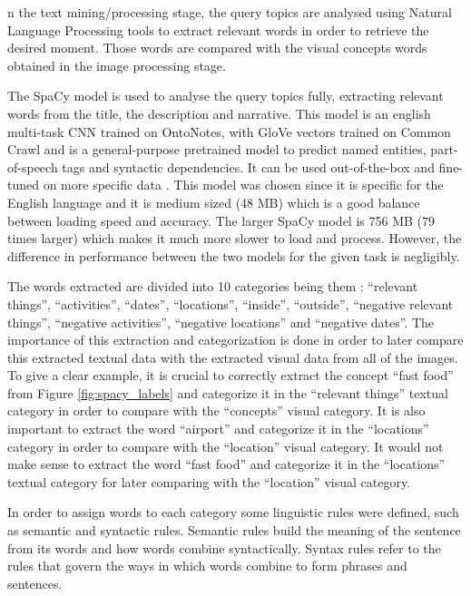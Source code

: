 n the text mining/processing stage, the query topics are analysed using Natural Language Processing tools to extract relevant words in order to retrieve the desired moment. Those words are compared with the visual concepts words obtained in the image processing stage. 

The SpaCy model \cite{Spacy2017} is used to analyse the query topics fully, extracting relevant words from the title, the description and narrative. This model is an english multi-task CNN trained on OntoNotes, with GloVe vectors trained on Common Crawl and is a general-purpose pretrained model to predict named entities, part-of-speech tags and syntactic dependencies. It can be used out-of-the-box and fine-tuned on more specific data \cite{Spacy2017}. This model was chosen since it is specific for the English language and it is medium sized (48 MB) which is a good balance between loading speed and accuracy. The larger SpaCy model is 756 MB (79 times larger) which makes it much more slower to load and process. However, the difference in performance between the two models for the given task is negligibly.




The words extracted are divided into 10 categories being them : \enquote{relevant things}, \enquote{activities}, \enquote{dates}, \enquote{locations}, \enquote{inside}, \enquote{outside}, \enquote{negative relevant things}, \enquote{negative activities}, \enquote{negative locations} and \enquote{negative dates}. The importance of this extraction and categorization is done in order to later compare this extracted textual data with the extracted visual data from all of the images. To give a clear example, it is crucial to correctly extract the concept \enquote{fast food} from Figure \ref{fig:spacy_labels} and categorize it in the \enquote{relevant things} textual category in order to compare with the \enquote{concepts} visual category. It is also important to extract the word \enquote{airport} and categorize it in the \enquote{locations} category in order to compare with the \enquote{location} visual category. It would not make sense to extract the word \enquote{fast food} and categorize it in the \enquote{locations} textual category for later comparing with the \enquote{location} visual category.

In order to assign words to each category some linguistic rules were defined,
such as semantic and syntactic rules. Semantic rules build the meaning of the
sentence from its words and how words combine syntactically. Syntax rules refer to
the rules that govern the ways in which words combine to form phrases and
sentences. 

